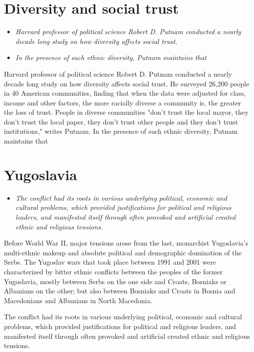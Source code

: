 \section{Diversity and social trust}\label{diversity-and-social-trust}

\begin{itemize}
\item
  \emph{Harvard professor of political science Robert D. Putnam
  conducted a nearly decade long study on how diversity affects social
  trust.}
\item
  \emph{In the presence of such ethnic diversity, Putnam maintains that}
\end{itemize}

Harvard professor of political science Robert D. Putnam conducted a
nearly decade long study on how diversity affects social trust. He
surveyed 26,200 people in 40 American communities, finding that when the
data were adjusted for class, income and other factors, the more
racially diverse a community is, the greater the loss of trust. People
in diverse communities "don't trust the local mayor, they don't trust
the local paper, they don't trust other people and they don't trust
institutions," writes Putnam. In the presence of such ethnic diversity,
Putnam maintains that

\section{Yugoslavia}\label{yugoslavia}

\begin{itemize}
\item
  \emph{The conflict had its roots in various underlying political,
  economic and cultural problems, which provided justifications for
  political and religious leaders, and manifested itself through often
  provoked and artificial created ethnic and religious tensions.}
\end{itemize}

Before World War II, major tensions arose from the last, monarchist
Yugoslavia's multi-ethnic makeup and absolute political and demographic
domination of the Serbs. The Yugoslav wars that took place between 1991
and 2001 were characterized by bitter ethnic conflicts between the
peoples of the former Yugoslavia, mostly between Serbs on the one side
and Croats, Bosniaks or Albanians on the other; but also between
Bosniaks and Croats in Bosnia and Macedonians and Albanians in North
Macedonia.

The conflict had its roots in various underlying political, economic and
cultural problems, which provided justifications for political and
religious leaders, and manifested itself through often provoked and
artificial created ethnic and religious tensions.

